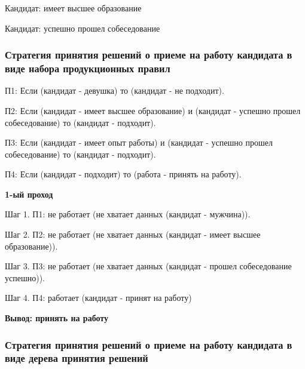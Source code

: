 \documentclass[14pt,a4paper,report]{report}
\begin{document}
Кандидат: имеет высшее образование

Кандидат: успешно прошел собеседование

\subsubsection{Стратегия принятия решений о приеме на работу кандидата в виде набора продукционных правил}


П1: Если (кандидат - девушка) то (кандидат - не подходит).

П2: Если (кандидат - имеет высшее образование) и (кандидат - успешно прошел собеседование) то (кандидат - подходит).

П3: Если (кандидат - имеет опыт работы) и (кандидат - успешно прошел собеседование) то (кандидат - подходит).

П4: Если (кандидат - подходит) то (работа - принять на работу).

\textbf{1-ый проход}

Шаг 1. П1: не работает (не хватает данных (кандидат - мужчина)).

Шаг 2. П2: не работает (не хватает данных (кандидат - имеет высшее образование)).

Шаг 3. П3: не работает (не хватает данных (кандидат - прошел собеседование успешно)).

Шаг 4. П4:  работает (кандидат - принят на работу)

\textbf{Вывод: принять на работу}

\subsubsection{Стратегия принятия решений о приеме на работу кандидата в виде дерева принятия решений}
\end{document}
